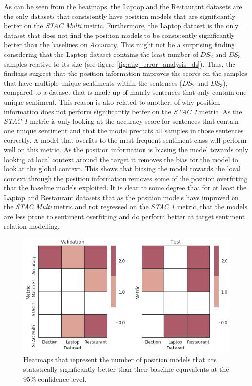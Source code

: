 As can be seen from the heatmaps, the Laptop and the Restaurant datasets are the only datasets that consistently have position models that are significantly better on the \textit{STAC Multi} metric. Furthermore, the Laptop dataset is the only dataset that does not find the position models to be consistently significantly better than the baselines on \textit{Accuracy}. This might not be a surprising finding considering that the Laptop dataset contains the least number of $DS_2$ and $DS_3$ samples relative to its size (see figure \ref{fig:aug_error_analysis_ds}). Thus, the findings suggest that the position information improves the scores on the samples that have multiple unique sentiments within the sentences ($DS_2$ and $DS_3$), compared to a dataset that is made up of mainly sentences that only contain one unique sentiment. This reason is also related to another, of why position information does not perform significantly better on the \textit{STAC 1} metric. As the \textit{STAC 1} metric is only looking at the accuracy score for sentences that contain one unique sentiment and that the model predicts all samples in those sentences correctly. A model that overfits to the most frequent sentiment class will perform well on this metric. As the position information is biasing the model towards only looking at local context around the target it removes the bias for the model to look at the global context. This shows that biasing the model towards the local context through the position information removes some of the position overfitting that the baseline models exploited. It is clear to some degree that for at least the Laptop and Restaurant datasets that as the position models have improved on the \textit{STAC Multi} metric and not regressed on the \textit{STAC 1} metric, that the models are less prone to sentiment overfitting and do perform better at target sentiment relation modelling.

\begin{figure}[h!]
    \centering
    \includegraphics[scale=0.6]{images/augmentation/methods_performance/Position_Encoding/position_overall_sig_models.png}
    \caption{Heatmaps that represent the number of position models that are statistically significantly better than their baseline equivalents at the 95\% confidence level.}
    \label{fig:aug_position_overall_sig_models}
\end{figure}

